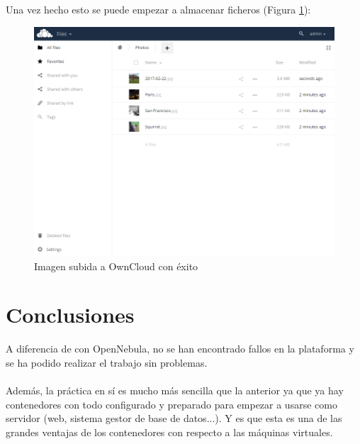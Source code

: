 Una vez hecho esto se puede empezar a almacenar ficheros (Figura \ref{fig:owncloud-uploaded-file}):

\begin{figure}[H]
	\centering
	\includegraphics[width=14cm]{img/owncloud-uploaded-file}
	\caption{Imagen subida a OwnCloud con éxito}
	\label{fig:owncloud-uploaded-file}
\end{figure}

\section{Conclusiones}

A diferencia de con OpenNebula, no se han encontrado fallos en la plataforma y se ha podido realizar el trabajo sin problemas.
\\ \\
Además, la práctica en sí es mucho más sencilla que la anterior ya que ya hay contenedores con todo configurado y preparado para empezar a usarse como servidor (web, sistema gestor de base de datos...). Y es que esta es una de las grandes ventajas de los contenedores con respecto a las máquinas virtuales.


\newpage



